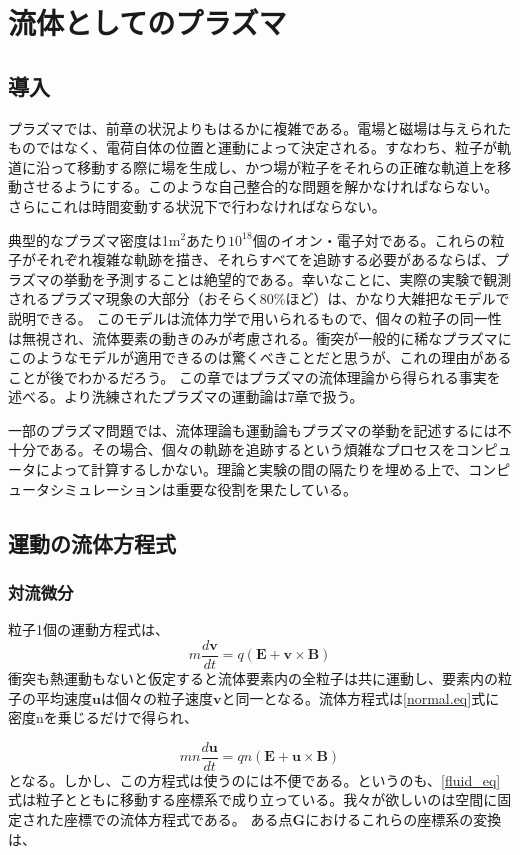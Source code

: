 \documentclass{ltjsarticle}
\numberwithin{equation}{section} %
\begin{document}
\section{流体としてのプラズマ}
\subsection{導入}
プラズマでは、前章の状況よりもはるかに複雑である。電場と磁場は与えられたものではなく、電荷自体の位置と運動によって決定される。すなわち、粒子が軌道に沿って移動する際に場を生成し、かつ場が粒子をそれらの正確な軌道上を移動させるようにする。このような自己整合的な問題を解かなければならない。さらにこれは時間変動する状況下で行わなければならない。

典型的なプラズマ密度は1$\si{\metre^2}$あたり$10^{18}$個のイオン・電子対である。これらの粒子がそれぞれ複雑な軌跡を描き、それらすべてを追跡する必要があるならば、プラズマの挙動を予測することは絶望的である。幸いなことに、実際の実験で観測されるプラズマ現象の大部分（おそらく80\%ほど）は、かなり大雑把なモデルで説明できる。
このモデルは流体力学で用いられるもので、個々の粒子の同一性は無視され、流体要素の動きのみが考慮される。衝突が一般的に稀なプラズマにこのようなモデルが適用できるのは驚くべきことだと思うが、これの理由があることが後でわかるだろう。
この章ではプラズマの流体理論から得られる事実を述べる。より洗練されたプラズマの運動論は7章で扱う。

一部のプラズマ問題では、流体理論も運動論もプラズマの挙動を記述するには不十分である。その場合、個々の軌跡を追跡するという煩雑なプロセスをコンピュータによって計算するしかない。理論と実験の間の隔たりを埋める上で、コンピュータシミュレーションは重要な役割を果たしている。

\subsection{運動の流体方程式}
\subsubsection{対流微分}

粒子1個の運動方程式は、
\begin{equation}
  m\frac{d\bm{v}}{dt} = q(\bm{E}+\bm{v}\times \bm{B}) \label{normal.eq}
\end{equation}
衝突も熱運動もないと仮定すると流体要素内の全粒子は共に運動し、要素内の粒子の平均速度$\bm{u}$は個々の粒子速度$\bm{v}$と同一となる。流体方程式は\eqref{normal.eq}式に密度nを乗じるだけで得られ、

\begin{equation}
  mn\frac{d\bm{u}}{dt} = qn(\bm{E}+\bm{u}\times \bm{B}) \label{fluid_eq}
\end{equation}
となる。しかし、この方程式は使うのには不便である。というのも、\eqref{fluid_eq}式は粒子とともに移動する座標系で成り立っている。我々が欲しいのは空間に固定された座標での流体方程式である。
ある点$\bm{G}$におけるこれらの座標系の変換は、
\end{document}
